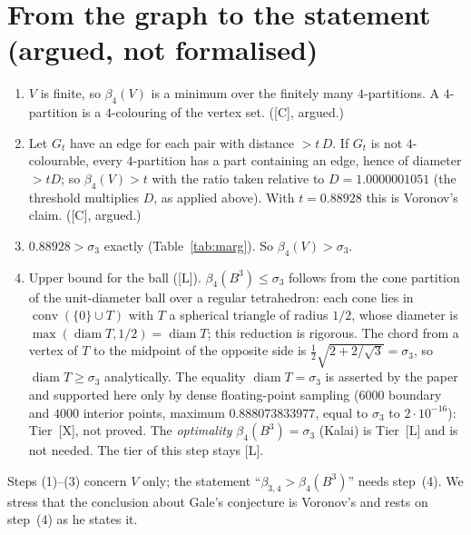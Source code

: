 \documentclass[10pt]{article}
\newcommand{\tier}[1]{\textsf{[#1]}}
\newcommand{\tL}{\tier{L}}
\newcommand{\tC}{\tier{C}}
\newcommand{\tX}{\tier{X}}
\newcommand{\bb}{\beta}
\begin{document}
\section{From the graph to the statement (argued, not formalised)}\label{sec:chain}
\begin{enumerate}\itemsep=1pt
\item $V$ is finite, so $\bb_4(V)$ is a minimum over the finitely many $4$-partitions. A $4$-partition is a $4$-colouring of the vertex set. (\tC{}, argued.)
\item Let $G_t$ have an edge for each pair with distance $>t\,D$. If $G_t$ is not $4$-colourable, every $4$-partition has a part containing an edge, hence of diameter $>tD$; so $\bb_4(V)>t$ with the ratio taken relative to $D=1.0000001051$ (the threshold multiplies $D$, as applied above). With $t=0.88928$ this is Voronov's claim. (\tC{}, argued.)
\item $0.88928>\sigma_3$ exactly (Table~\ref{tab:marg}). So $\bb_4(V)>\sigma_3$.
\item Upper bound for the ball (\tL{}). $\bb_4(B^3)\le\sigma_3$ follows from the cone partition of the unit-diameter ball over a regular tetrahedron: each cone lies in $\operatorname{conv}(\{0\}\cup T)$ with $T$ a spherical triangle of radius $1/2$, whose diameter is $\max(\operatorname{diam}T,1/2)=\operatorname{diam}T$; this reduction is rigorous. The chord from a vertex of $T$ to the midpoint of the opposite side is $\tfrac12\sqrt{2+2/\sqrt3}=\sigma_3$, so $\operatorname{diam}T\ge\sigma_3$ analytically. The equality $\operatorname{diam}T=\sigma_3$ is asserted by the paper and supported here only by dense floating-point sampling ($6000$ boundary and $4000$ interior points, maximum $0.888073833977$, equal to $\sigma_3$ to $2\cdot10^{-16}$): Tier~\tX{}, not proved. The \emph{optimality} $\bb_4(B^3)=\sigma_3$ (Kalai) is Tier~\tL{} and is not needed. The tier of this step stays \tL{}.
\end{enumerate}
Steps (1)--(3) concern $V$ only; the statement ``$\bb_{3,4}>\bb_4(B^3)$'' needs step~(4). We stress that the conclusion about Gale's conjecture is Voronov's and rests on step~(4) as he states it.
\end{document}
